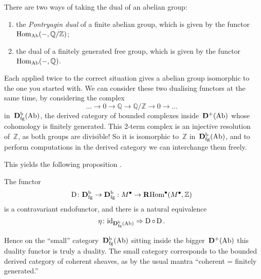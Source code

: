 There are two ways of taking the dual of an abelian group:
\begin{enumerate}
  \item the \emph{Pontryagin dual} of a finite abelian group, which is given by the functor~$\operatorname{Hom}_{\mathrm{Ab}}(-,\mathbb{Q}/\mathbb{Z})$;
  \item the dual of a finitely generated free group, which is given by the functor~$\operatorname{Hom}_{\mathrm{Ab}}(-,\mathbb{Q})$.
\end{enumerate}
Each applied twice to the correct situation gives a abelian group isomorphic to the one you started with. We can consider these two dualising functors at the same time, by considering the complex
\begin{equation}
  \dotso\to0\to\mathbb{Q}\to\mathbb{Q}/\mathbb{Z}\to0\to\dotso
\end{equation}
in~$\mathbf{D}_{\mathrm{fg}}^{\mathrm{b}}(\mathrm{Ab})$, the derived category of bounded complexes inside~$\mathbf{D}^+(\mathrm{Ab})$ whose cohomology is finitely generated. This 2-term complex is an injective resolution of~$\mathbb{Z}$, as both groups are divisible! So it is isomorphic to~$\mathbb{Z}$ in~$\mathbf{D}_{\mathrm{fg}}^{\mathrm{b}}(\mathrm{Ab})$, and to perform computations in the derived category we can interchange them freely.

This yields the following proposition \cite[proposition:V.1-1]{hartshorne-residues-and-duality}.
\begin{proposition}
  \label{proposition:duality-abelian-groups}
  The functor
  \begin{equation}
    \operatorname{D}\colon\mathbf{D}_{\mathrm{fg}}^{\mathrm{b}}\to\mathbf{D}_{\mathrm{fg}}^{\mathrm{b}}:M^\bullet\to\operatorname{\mathbf{R}Hom}^\bullet(M^\bullet,\mathbb{Z})
  \end{equation}
  is a contravariant endofunctor, and there is a natural equivalence
  \begin{equation}
    \eta\colon\mathrm{id}_{\mathbf{D}_{\mathrm{fg}}^{\mathrm{b}}(\mathrm{Ab})}\Rightarrow\operatorname{D}\circ\operatorname{D}.
  \end{equation}
\end{proposition}
Hence on the ``small'' category~$\mathbf{D}_{\mathrm{fg}}^{\mathrm{b}}(\mathrm{Ab})$ sitting inside the bigger~$\mathbf{D}^+(\mathrm{Ab})$ this duality functor is truly a duality. The small category corresponds to the bounded derived category of coherent sheaves, as by the usual mantra ``coherent = finitely generated.''

